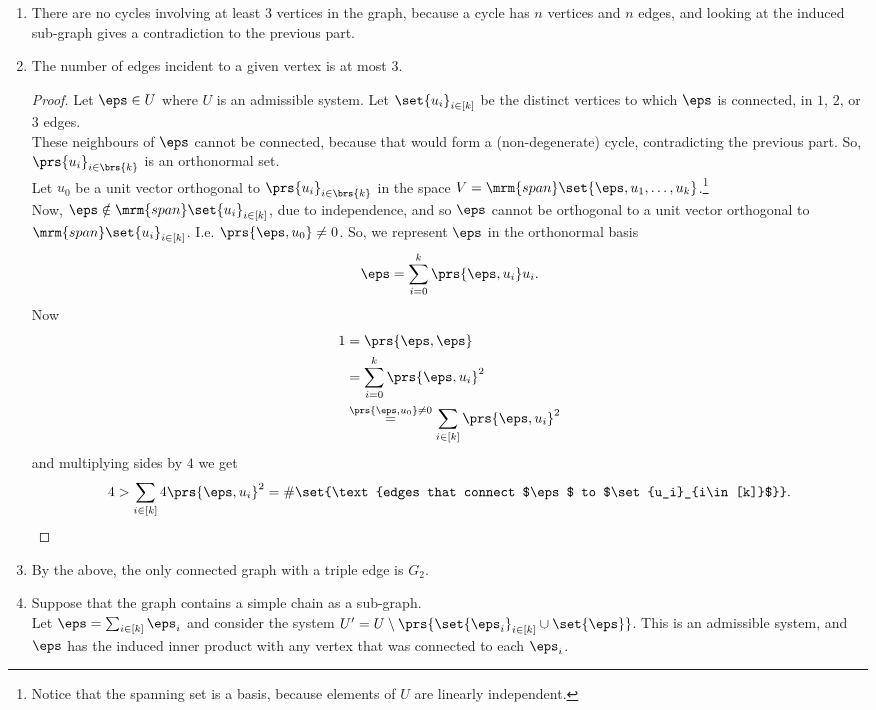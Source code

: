 \documentclass[10pt,a4paper,twoside,openany,hidelinks]{book}
\begin{document}
\begin{enumerate}
\item There are no cycles involving at least $3$ vertices in the graph, because a cycle has $n$ vertices and $n$ edges, and looking at the induced sub-graph gives a contradiction to the previous part.

\item The number of edges incident to a given vertex is at most $3$.
\begin{proof}
Let $\eps \in U$ where $U$ is an admissible system. Let $\set{u_i}_{i \in [k]}$ be the distinct vertices to which $\eps$ is connected, in $1$, $2$, or $3$ edges.\\
These neighbours of $\eps$ cannot be connected, because that would form a (non-degenerate) cycle, contradicting the previous part.
So, $\prs{u_i}_{i \in \brs{k}}$ is an orthonormal set.\\
Let $u_0$ be a unit vector orthogonal to $\prs{u_i}_{i \in \brs{k}}$ in the space $V=\mrm{span}\set{\eps, u_1, \ldots, u_k}$.\footnote{Notice that the spanning set is a basis, because elements of $U$ are linearly independent.}\\
Now, $\eps \notin \mrm{span}\set{u_i}_{i \in [k]}$, due to independence, and so $\eps$ cannot be orthogonal to a unit vector orthogonal to $\mrm{span}\set{u_i}_{i \in [k]}$. I.e. $\prs{\eps, u_0} \neq 0$.
So, we represent $\eps$ in the orthonormal basis
\[\eps = \sum_{i = 0}^k \prs{\eps, u_i} u_i \text{.}\]
Now
\begin{align*}
1 &= \prs{\eps, \eps} \\&=
\sum_{i=0}^k \prs{\eps, u_i}^2 \\&\stackrel{\prs{\eps, u_0} \neq 0}{=}
\sum_{i \in [k]} \prs{\eps, u_i}^2
\end{align*}
and multiplying sides by $4$ we get
\[4 > \sum_{i \in [k]} 4\prs{\eps, u_i}^2 = \#\set{\text{edges that connect $\eps$ to $\set{u_i}_{i\in[k]}$}} \text{.}\]
\end{proof}

\item
By the above, the only connected graph with a triple edge is $G_2$.

\item Suppose that the graph contains a simple chain as a sub-graph.\\
Let $\eps = \sum_{i \in [k]} \eps_i$ and consider the system $U' = U \setminus \prs{\set{\eps_i}_{i \in [k]} \cup \set{\eps}}$. This is an admissible system, and $\eps$ has the induced inner product with any vertex that was connected to each $\eps_i$.


\end{enumerate}
\end{document}

